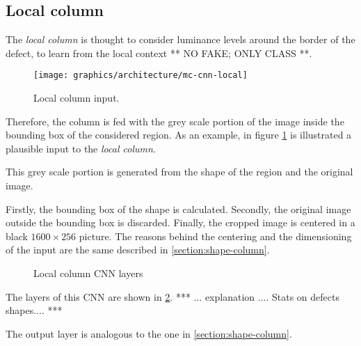    \subsection{Local column}\label{section:local-column}
        \par{
            The \emph{local column} is thought to consider luminance levels around the border of the defect, to learn from the local context ** NO FAKE; ONLY CLASS **.
        }
        \begin{figure}
            \centering
            \texttt{[image: graphics/architecture/mc-cnn-local]}
            \caption{Local column input.}\label{fig:mc-cnn:local-input}
        \end{figure}
        \par{
            Therefore, the column is fed with the grey scale portion of the image inside the bounding box of the considered region. As an example, in figure \ref{fig:mc-cnn:local-input} is illustrated a plausible input to the \emph{local column}.
        }
        \par{
            This grey scale portion is generated from the shape of the region and the original image.
        }
        \par{
            Firstly, the bounding box of the shape is calculated. Secondly, the original image outside the bounding box is discarded. Finally, the cropped image is centered in a black $1600\times 256$ picture. The reasons behind the centering and the dimensioning of the input are the same described in \ref{section:shape-column}.
        }
        \begin{figure}
            \centering
            \caption{Local column CNN layers}\label{fig:mc-cnn:local-structure}
        \end{figure}
        \par{
            The layers of this CNN are shown in \ref{fig:mc-cnn:local-structure}. *** ... explanation .... Stats on defects shapes.... ***
        }
        \par{
            The output layer is analogous to the one in \ref{section:shape-column}.
        }
